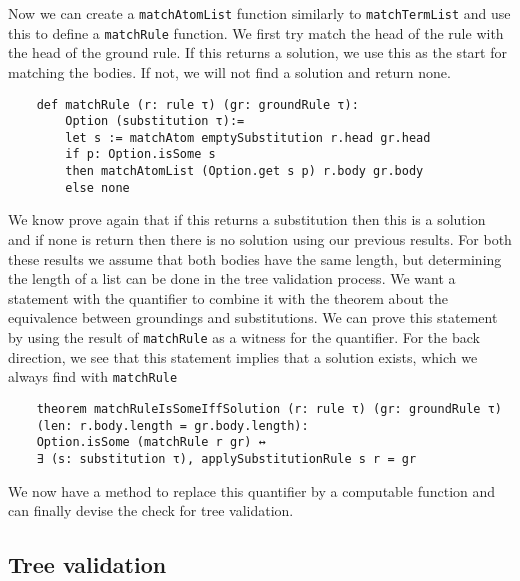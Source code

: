 Now we can create a \texttt{matchAtomList} function similarly to \texttt{matchTermList} and use this to define a \texttt{matchRule} function. We first try match the head of the rule with the head of the ground rule. If this returns a solution, we use this as the start for matching the bodies. If not, we will not find a solution and return none.

\begin{lstlisting}
    def matchRule (r: rule τ) (gr: groundRule τ):
        Option (substitution τ):=
        let s := matchAtom emptySubstitution r.head gr.head
        if p: Option.isSome s
        then matchAtomList (Option.get s p) r.body gr.body
        else none

\end{lstlisting}

We know prove again that if this returns a substitution then this is a solution and if none is return then there is no solution using our previous results. For both these results we assume that both bodies have the same length, but determining the length of a list can be done in the tree validation process.
We want a statement with the quantifier to combine it with the theorem about the equivalence between groundings and substitutions. We can prove this statement by using the result of \texttt{matchRule} as a witness for the quantifier. For the back direction, we see that this statement implies that a solution exists, which we always find with \texttt{matchRule}

\begin{lstlisting}
    theorem matchRuleIsSomeIffSolution (r: rule τ) (gr: groundRule τ) 
    (len: r.body.length = gr.body.length): 
    Option.isSome (matchRule r gr) ↔ 
    ∃ (s: substitution τ), applySubstitutionRule s r = gr
\end{lstlisting}

We now have a method to replace this quantifier by a computable function and can finally devise the check for tree validation.

\subsection{Tree validation}

